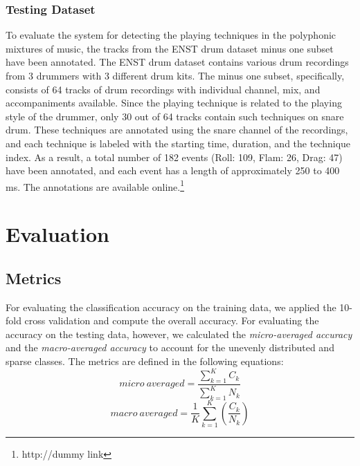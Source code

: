 \documentclass{article}
\begin{document}
{{{{{{{{{\subsubsection{Testing Dataset}
\label{ssec:testData}
To evaluate the system for detecting the playing techniques in the polyphonic mixtures of music, the tracks from the ENST drum dataset minus one subset \cite{Gillet2006} have been annotated. The ENST drum dataset contains various drum recordings from 3 drummers with 3 different drum kits. The minus one subset, specifically, consists of 64 tracks of drum recordings with individual channel, mix, and accompaniments available. Since the playing technique is related to the playing style of the drummer, only 30 out of 64 tracks contain such techniques on snare drum. These techniques are annotated using the snare channel of the recordings, and each technique is labeled with the starting time, duration, and the technique index. As a result, a total number of 182 events (Roll: 109, Flam: 26, Drag: 47) have been annotated, and each event has a length of approximately 250 to 400 \unit{ms}. The annotations are available online.\footnote{http://dummy link}


\section{Evaluation}\label{sec:eval}
\subsection{Metrics}\label{ssec:metrics}
For evaluating the classification accuracy on the training data, we applied the 10-fold cross validation and compute the overall accuracy. For evaluating the accuracy on the testing data, however, we calculated the \textit{micro-averaged accuracy} and the \textit{macro-averaged accuracy}\cite{yang1999} to account for the unevenly distributed and sparse classes. The metrics are defined in the following equations:
\begin{equation}
micro~averaged = \frac{ \sum_{k = 1}^{K} C_{k} }{ \sum_{k = 1}^{K} N_{k} }
\end{equation}
\begin{equation}
macro~averaged = \frac{1}{K} \sum_{k = 1}^{K} (\frac{C_{k}}{N_{k}})
\end{equation}

}}}}}}}}}
\end{document}
